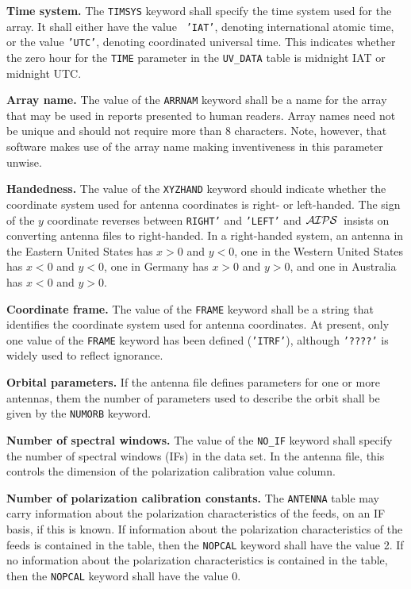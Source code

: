\documentclass[twoside]{article}
\newcommand{\AIPS}{{$\cal AIPS\/$}}
\begin{document}
{\bf Time system.} The {\tt TIMSYS} keyword shall specify the time
system used for the array.  It shall either have the value {\tt
'IAT'}, denoting international atomic time, or the value {\tt 'UTC'},
denoting coordinated universal time.  This indicates whether the zero
hour for the {\tt TIME} parameter in the {\tt UV\_DATA} table is
midnight IAT or midnight UTC\@.

{\bf Array name.}  The value of the {\tt ARRNAM} keyword shall be a
name for the array that may be used in reports presented to human
readers.  Array names need not be unique and should not require
more than 8 characters.  Note, however, that software makes use of the
array name making inventiveness in this parameter unwise.

{\bf Handedness.}  The value of the {\tt XYZHAND} keyword should
indicate whether the coordinate system used for antenna coordinates is
right- or left-handed.  The sign of the $y$ coordinate reverses
between {\tt RIGHT'} and {\tt 'LEFT'} and \AIPS\ insists on
converting antenna files to right-handed.  In a right-handed system,
an antenna in the Eastern United States has $x > 0$ and $y < 0$, one
in the Western United States has $x < 0$ and $y < 0$, one in Germany
has $x > 0$ and $y > 0$, and one in Australia has $x < 0$ and $y > 0$.

{\bf Coordinate frame.} The value of the {\tt FRAME} keyword shall be a
string that identifies the coordinate system used for antenna
coordinates.  At present, only one value of the {\tt FRAME} keyword
has been defined ({\tt 'ITRF'}), although {\tt '????'} is widely used
to reflect ignorance.

{\bf Orbital parameters.} If the antenna file defines parameters for
one or more antennas, them the number of parameters used to describe
the orbit shall be given by the {\tt NUMORB} keyword.

{\bf Number of spectral windows.} The value of the {\tt NO\_IF}
keyword shall specify the number of spectral windows (IFs) in the data
set.  In the antenna file, this controls the dimension of the
polarization calibration value column.

{\bf Number of polarization calibration constants.}  The {\tt ANTENNA}
table may carry information about the polarization characteristics of
the feeds, on an IF basis, if this is known.  If information about the
polarization characteristics of the feeds is contained in the table,
then the {\tt NOPCAL} keyword shall have the value 2.  If no
information about the polarization characteristics is contained in the
table, then the {\tt NOPCAL} keyword shall have the value 0.
\end{document}
